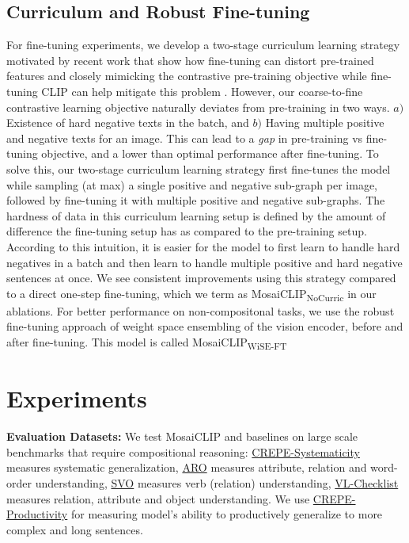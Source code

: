 \documentclass[11pt]{article}
\newcommand{\methodcomp}{MosaiCLIP}
\newcommand{\methodcompNoCurric}{MosaiCLIP\textsubscript{NoCurric}}
\newcommand{\methodcompwiseft}{MosaiCLIP\textsubscript{WiSE-FT}}
\begin{document}
\subsection{Curriculum and Robust Fine-tuning}
\label{subsec_curriculum_training}
\noindent For fine-tuning experiments, we develop a two-stage curriculum learning strategy motivated by recent work \citep{goyal2022finetune, wortsman2022robust, kumar2022fine} that show how fine-tuning can distort pre-trained features and closely mimicking the contrastive pre-training objective while fine-tuning CLIP can help mitigate this problem \citep{goyal2022finetune}. However, our coarse-to-fine contrastive learning objective naturally deviates from pre-training in two ways. $a)$ Existence of hard negative texts in the batch, and $b)$ Having multiple positive and negative texts for an image. This can lead to a \textit{gap} in pre-training vs fine-tuning objective, and a lower than optimal performance after fine-tuning. To solve this, our two-stage curriculum learning strategy first fine-tunes the model while sampling (at max) a single positive and negative sub-graph per image, followed by fine-tuning it with multiple positive and negative sub-graphs. The hardness of data in this curriculum learning setup is defined by the amount of difference the fine-tuning setup has as compared to the pre-training setup. According to this intuition, it is easier for the model to first learn to handle hard negatives in a batch and then learn to handle multiple positive and hard negative sentences at once. We see consistent improvements using this strategy compared to a direct one-step fine-tuning, which we term as \methodcompNoCurric{} in our ablations. For better performance on non-compositonal tasks, we use the robust fine-tuning approach \citep{wortsman2022robust} of weight space ensembling of the vision encoder, before and after fine-tuning. This model is called \methodcompwiseft{} \section{Experiments}
\label{sec_experiments}
\noindent \textbf{Evaluation Datasets:}
We test \methodcomp{} and baselines on large scale benchmarks that require compositional reasoning: \underline{CREPE-Systematicity} \cite{ma2022crepe} measures systematic generalization, \underline{ARO} \cite{yuksekgonul2022and} measures attribute, relation and word-order understanding, \underline{SVO} \cite{hendricks-nematzadeh-2021-probing} measures verb (relation) understanding, \underline{VL-Checklist} \cite{zhao2022vlchecklist} measures relation, attribute and object understanding. We use \underline{CREPE-Productivity} \cite{ma2022crepe} for measuring model's ability to productively generalize to more complex and long sentences.
\end{document}
